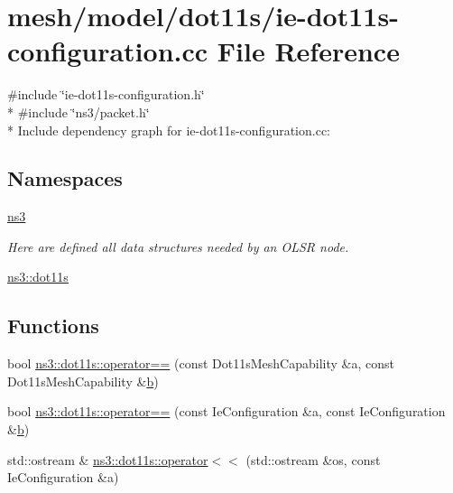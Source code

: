\hypertarget{ie-dot11s-configuration_8cc}{}\section{mesh/model/dot11s/ie-\/dot11s-\/configuration.cc File Reference}
\label{ie-dot11s-configuration_8cc}
{\ttfamily \#include \char`\"{}ie-\/dot11s-\/configuration.\+h\char`\"{}}\\*
{\ttfamily \#include \char`\"{}ns3/packet.\+h\char`\"{}}\\*
Include dependency graph for ie-\/dot11s-\/configuration.cc\+:
\subsection*{Namespaces}
\begin{DoxyCompactItemize}
\item 
 \hyperlink{namespacens3}{ns3}
\begin{DoxyCompactList}\small\item\em Here are defined all data structures needed by an O\+L\+SR node. \end{DoxyCompactList}\item 
 \hyperlink{namespacens3_1_1dot11s}{ns3\+::dot11s}
\end{DoxyCompactItemize}
\subsection*{Functions}
\begin{DoxyCompactItemize}
\item 
bool \hyperlink{namespacens3_1_1dot11s_ad7bacd8b85ae4f1f7db30407e1a839de}{ns3\+::dot11s\+::operator==} (const Dot11s\+Mesh\+Capability \&a, const Dot11s\+Mesh\+Capability \&\hyperlink{lte__pathloss_8m_a21ad0bd836b90d08f4cf640b4c298e7c}{b})
\item 
bool \hyperlink{namespacens3_1_1dot11s_a288f06a242c228041c8a9c6c263fbe87}{ns3\+::dot11s\+::operator==} (const Ie\+Configuration \&a, const Ie\+Configuration \&\hyperlink{lte__pathloss_8m_a21ad0bd836b90d08f4cf640b4c298e7c}{b})
\item 
std\+::ostream \& \hyperlink{namespacens3_1_1dot11s_a427f6494f33ad73c73a90846abec787d}{ns3\+::dot11s\+::operator$<$$<$} (std\+::ostream \&os, const Ie\+Configuration \&a)
\end{DoxyCompactItemize}
